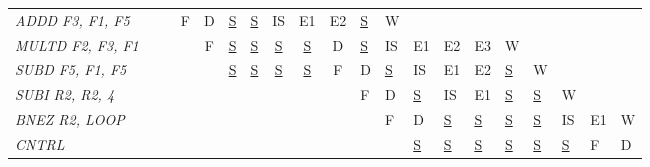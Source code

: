 \begin{enumerate}
\begin{table}[H]
{\begin{tabular}{l|cccccccccllllllllll}
            \textit{ADDD F3, F1, F5}  &                      &                      & F                    & D                    & {\underline{S}}              & {\underline{S}}              & IS                   & E1                   & E2                   & {\underline{S}}     & W           &             &             &             &             &             &             &             &             \\
            \textit{MULTD F2, F3, F1} &                      &                      &                      & F                    & {\underline{S}}              & {\underline{S}}              & {\underline{S}}              & {\underline{S}}              & D                    & {\underline{S}}     & IS          & E1          & E2          & E3          & W           &             &             &             &             \\
            \textit{SUBD F5, F1, F5}  &                      &                      &                      &                      & {\underline{S}}              & {\underline{S}}              & {\underline{S}}              & {\underline{S}}              & F                    & D           & {\underline{S}}     & IS          & E1          & E2          & {\underline{S}}     & W           &             &             &             \\
            \textit{SUBI R2, R2, 4}   & \multicolumn{1}{l}{} & \multicolumn{1}{l}{} & \multicolumn{1}{l}{} & \multicolumn{1}{l}{} & \multicolumn{1}{l}{} & \multicolumn{1}{l}{} & \multicolumn{1}{l}{} & \multicolumn{1}{l}{} & \multicolumn{1}{l}{} & F           & D           & {\underline{S}}     & IS          & E1          & {\underline{S}}     & {\underline{S}}     & W           &             &             \\
            \textit{BNEZ R2, LOOP}    & \multicolumn{1}{l}{} & \multicolumn{1}{l}{} & \multicolumn{1}{l}{} & \multicolumn{1}{l}{} & \multicolumn{1}{l}{} & \multicolumn{1}{l}{} & \multicolumn{1}{l}{} & \multicolumn{1}{l}{} & \multicolumn{1}{l}{} &             & F           & D           & {\underline{S}}     & {\underline{S}}     & {\underline{S}}     & {\underline{S}}     & IS          & E1          & W           \\
            \textit{CNTRL}            & \multicolumn{1}{l}{} & \multicolumn{1}{l}{} & \multicolumn{1}{l}{} & \multicolumn{1}{l}{} & \multicolumn{1}{l}{} & \multicolumn{1}{l}{} & \multicolumn{1}{l}{} & \multicolumn{1}{l}{} & \multicolumn{1}{l}{} &             &             & {\underline{S}}     & {\underline{S}}     & {\underline{S}}     & {\underline{S}}     & {\underline{S}}     & {\underline{S}}     & F           & D          
            \end{tabular}%
            }
        \end{table}
\end{enumerate}